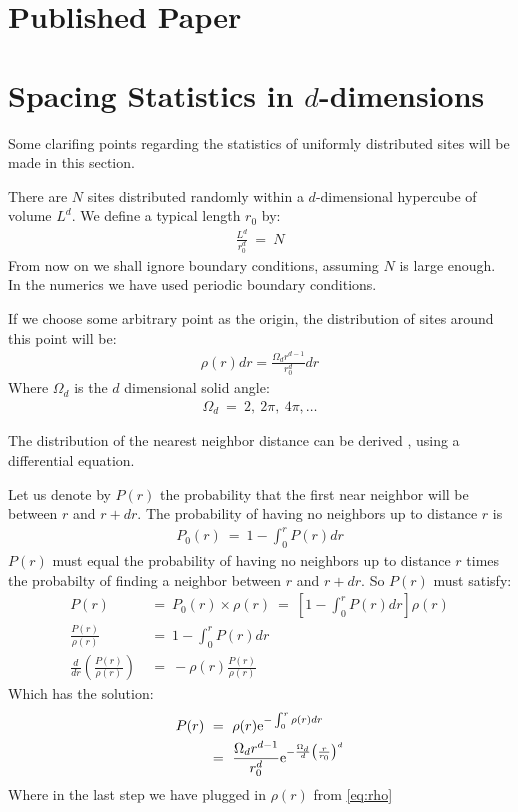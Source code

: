 \chapter{Published Paper}\label{sec:papers}


\chapter{Spacing Statistics in $d$-dimensions}\label{sec:spacing}

Some clarifing points regarding the statistics of uniformly distributed sites 
will be made in this section.


There are $N$ sites distributed randomly within a $d$-dimensional
hypercube of volume $L^d$. We define a typical length $r_0$ by:
%
\begin{align}
\frac{L^d}{r_0^d} \ =\ N
\end{align}
%
From now on we shall ignore boundary conditions, assuming $N$ is large enough.
In the numerics we have used periodic boundary conditions.


If we choose some arbitrary point as the origin, the distribution of sites
around this point will be:
%
\begin{align}\label{eq:rho}
\rho(r)dr = \frac{\Omega_d r^{d-1}}{r_0^d}dr
\end{align}
% 
Where $\Omega_d$ is the $d$ dimensional solid angle:
%
\begin{align}
\Omega_d \ =\ 2,\ 2\pi,\ 4\pi, \ldots
\end{align}
%

The distribution of the nearest neighbor distance can be 
derived \cite{hertz_uber_1909,*Chandrasekhar_stochastic_1943,*Torquato_nearest-neighbor_1990},
using a differential equation. 


Let us denote by $P(r)$ the probability that the first near neighbor will be
between $r$ and $r+dr$. The probability of having no neighbors up to distance $r$ is
%
\begin{align}
P_0(r) \ =\  1 - \int_0^r P(r)dr
\end{align}
$P(r)$ must equal the probability of having no neighbors up to distance $r$ times
the probabilty of finding a neighbor between $r$ and $r+dr$. So $P(r)$ must satisfy:
%
\begin{align}
P(r) \ &=\ P_0(r) \times \rho(r) \ =\ \left[ 1-\int_0^r P(r)dr \right] \rho(r) \\
\frac{P(r)}{\rho(r)}\ &=\  1-\int_0^r P(r)dr \\
\frac{d}{dr}\left(\frac{P(r)}{\rho(r)}\right) \ &=\ -\rho(r)\frac{ P(r)}{\rho(r)}
\end{align}
%
Which has the solution:
%
\begin{align}
P(r) \ &=\ \rho(r) \mbox{e}^{-\int_0^r \rho(r) dr} \\
       &=\ \frac{\Omega_d r^{d-1}}{r_0^d} \mbox{e}^{-\frac{\Omega_d}{d} \left(\frac{r}{r_0}\right)^d}  \label{eq:spacing_dist}
\end{align}
%
Where in the last step we have plugged in $\rho(r)$ from \autoref{eq:rho}
%


